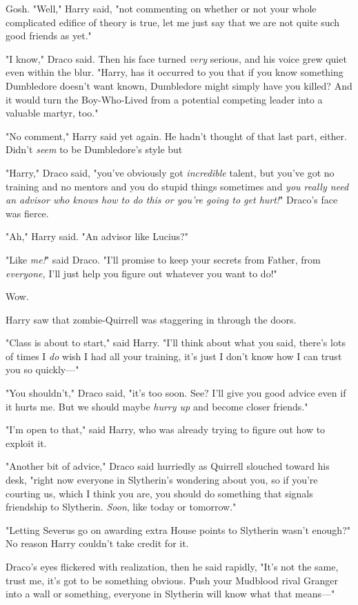 Gosh. "Well," Harry said, "not commenting on whether or not your whole
complicated edifice of theory is true, let me just say that we are not quite
such good friends as yet."

"I know," Draco said. Then his face turned \emph{very} serious, and his voice
grew quiet even within the blur. "Harry, has it occurred to you that if you
know something Dumbledore doesn't want known, Dumbledore might simply have you
killed? And it would turn the Boy-Who-Lived from a potential competing leader
into a valuable martyr, too."

"No comment," Harry said yet again. He hadn't thought of that last part,
either. Didn't \emph{seem} to be Dumbledore's style{\el} but{\el}

"Harry," Draco said, "you've obviously got \emph{incredible} talent, but you've
got no training and no mentors and you do stupid things sometimes and \emph{you
really need an advisor who knows how to do this or you're going to get hurt!}"
Draco's face was fierce.

"Ah," Harry said. "An advisor like Lucius?"

"Like \emph{me!}" said Draco. "I'll promise to keep your secrets from Father,
from \emph{everyone,} I'll just help you figure out whatever you want to do!"

Wow.

Harry saw that zombie-Quirrell was staggering in through the doors.

"Class is about to start," said Harry. "I'll think about what you said, there's
lots of times I \emph{do} wish I had all your training, it's just I don't know
how I can trust you so quickly---"

"You shouldn't," Draco said, "it's too soon. See? I'll give you good advice
even if it hurts me. But we should maybe \emph{hurry up} and become closer
friends."

"I'm open to that," said Harry, who was already trying to figure out how to
exploit it.

"Another bit of advice," Draco said hurriedly as Quirrell slouched toward his
desk, "right now everyone in Slytherin's wondering about you, so if you're
courting us, which I think you are, you should do something that signals
friendship to Slytherin. \emph{Soon}, like today or tomorrow."

"Letting Severus go on awarding extra House points to Slytherin wasn't enough?"
No reason Harry couldn't take credit for it.

Draco's eyes flickered with realization, then he said rapidly, "It's not the
same, trust me, it's got to be something obvious. Push your Mudblood rival
Granger into a wall or something, everyone in Slytherin will know what that
means---"


